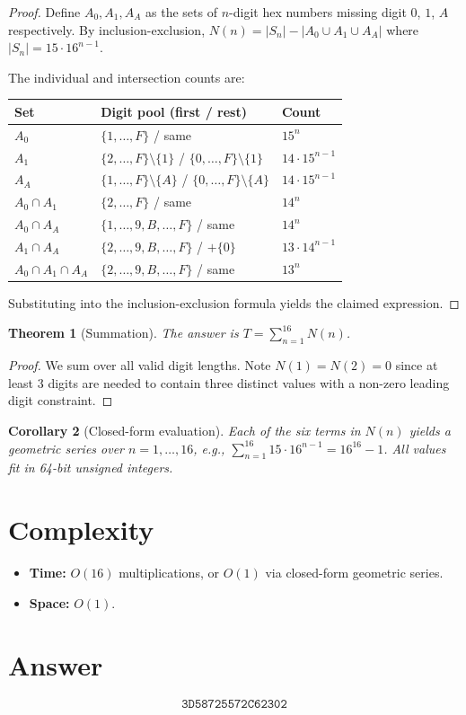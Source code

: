 \documentclass[12pt]{article}
\newtheorem{theorem}{Theorem}
\newtheorem{corollary}[theorem]{Corollary}
\theoremstyle{definition}
\begin{document}
\begin{proof}
Define $A_0, A_1, A_A$ as the sets of $n$-digit hex numbers missing digit $0$, $1$, $A$ respectively. By inclusion-exclusion, $N(n) = |S_n| - |A_0 \cup A_1 \cup A_A|$ where $|S_n| = 15 \cdot 16^{n-1}$.

The individual and intersection counts are:
\begin{center}
\begin{tabular}{@{}lll@{}}
\toprule
Set & Digit pool (first / rest) & Count \\
\midrule
$A_0$ & $\{1,\ldots,F\}$ / same & $15^n$ \\
$A_1$ & $\{2,\ldots,F\} \setminus\{1\}$ / $\{0,\ldots,F\}\setminus\{1\}$ & $14 \cdot 15^{n-1}$ \\
$A_A$ & $\{1,\ldots,F\}\setminus\{A\}$ / $\{0,\ldots,F\}\setminus\{A\}$ & $14 \cdot 15^{n-1}$ \\
$A_0 \cap A_1$ & $\{2,\ldots,F\}$ / same & $14^n$ \\
$A_0 \cap A_A$ & $\{1,\ldots,9,B,\ldots,F\}$ / same & $14^n$ \\
$A_1 \cap A_A$ & $\{2,\ldots,9,B,\ldots,F\}$ / $+\{0\}$ & $13 \cdot 14^{n-1}$ \\
$A_0 \cap A_1 \cap A_A$ & $\{2,\ldots,9,B,\ldots,F\}$ / same & $13^n$ \\
\bottomrule
\end{tabular}
\end{center}
Substituting into the inclusion-exclusion formula yields the claimed expression.
\end{proof}

\begin{theorem}[Summation]
The answer is $T = \sum_{n=1}^{16} N(n)$.
\end{theorem}

\begin{proof}
We sum over all valid digit lengths. Note $N(1) = N(2) = 0$ since at least 3 digits are needed to contain three distinct values with a non-zero leading digit constraint.
\end{proof}

\begin{corollary}[Closed-form evaluation]
Each of the six terms in $N(n)$ yields a geometric series over $n = 1, \ldots, 16$, e.g., $\sum_{n=1}^{16} 15 \cdot 16^{n-1} = 16^{16} - 1$. All values fit in 64-bit unsigned integers.
\end{corollary}

\section{Complexity}
\begin{itemize}
    \item \textbf{Time:} $O(16)$ multiplications, or $O(1)$ via closed-form geometric series.
    \item \textbf{Space:} $O(1)$.
\end{itemize}

\section{Answer}

\[
\boxed{\texttt{3D58725572C62302}}
\]
\end{document}
